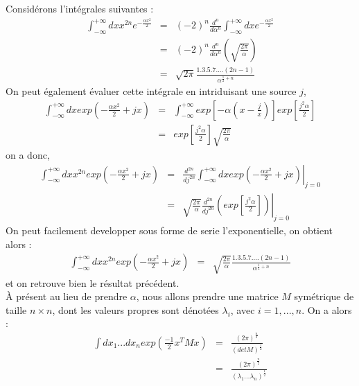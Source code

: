 \documentclass[a4paper,11pt]{article}
\theoremstyle{plain}
\theoremstyle{definition}
\theoremstyle{remark}
\numberwithin{equation}{section}
\numberwithin{equation}{subsection}
\numberwithin{figure}{section}
\begin{document}
\noindent
Considérons l'intégrales suivantes :
\begin{eqnarray}
 \int_{-\infty}^{+\infty} dx x^{2n} e^{- \frac{\alpha x^2}{2} }  &=& (-2)^{n} \frac{d^{n}}{d \alpha^{n}}  \int_{-\infty}^{+\infty} dx  
e^{- \frac{\alpha x^2}{2} }  \\
                                                                 &=& (-2)^{n} \frac{d^{n}}{d \alpha^{n}} \left( \sqrt{\frac{2 \pi}{\alpha}} \right) \\
                                                                 &=&  \sqrt{2 \pi}  \frac{1.3.5.7.  ... (2n-1)}{\alpha^{\frac{1}{2}+n}}
\end{eqnarray}
On peut également évaluer cette intégrale en intriduisant une source $j$,
\begin{eqnarray}
 \int_{-\infty}^{+\infty} dx  exp \left( - \frac{\alpha x^2}{2}  +j x \right) &=&  \int_{-\infty}^{+\infty}  
exp \left [ -\alpha \left( x- \frac{j}{x} \right) \right ] exp \left [ \frac{j^2 \alpha}{2} \right ]  \\
                                                                              &=&  exp \left [ \frac{j^2 \alpha}{2} \right ]   
\sqrt{\frac{2 \pi}{\alpha}}
\end{eqnarray}
on a donc,
\begin{eqnarray}
  \int_{-\infty}^{+\infty} dx  x^{2n}  exp \left( - \frac{\alpha x^2}{2}  +j x \right) &=& \left.  \frac{d^{2n}}{d j^{2n}}  
\int_{-\infty}^{+\infty} dx  exp \left( - \frac{\alpha x^2}{2}  +j x \right) \right |_{j=0} \\
                                                                                       &=&  \left.  \sqrt{\frac{2 \pi}{\alpha}}  
\frac{d^{2n}}{d j^{2n}}  \left( exp \left [ \frac{j^2 \alpha}{2} \right ]   \right)   \right |_{j=0}
\end{eqnarray}
On peut facilement developper sous forme de serie l'exponentielle, on obtient alors :
\begin{eqnarray}
  \int_{-\infty}^{+\infty} dx  x^{2n}  exp \left( - \frac{\alpha x^2}{2}  +j x \right) &=&   \sqrt{\frac{2 \pi}{\alpha}}  
\frac{1.3.5.7.  ...  (2n-1)}{\alpha ^{\frac{1}{2}+n}}
\end{eqnarray}
et on retrouve bien le résultat précédent.\\
À présent au lieu de prendre $\alpha$, nous allons prendre une matrice $M$ symétrique de taille $n \times n$, dont les valeurs propres 
sont dénotées $\lambda_{i}$, avec $i= 1, ..., n$. On a alors :
\begin{eqnarray}
 \int dx_{1}  ...  dx_{n} exp \left( \frac{-1}{2} x^{T} M x \right) &=&  
\frac{ \left(2 \pi \right)^{\frac{n}{2} }  }{ \left( det M \right)^{\frac{1}{2}} } \\
                                                                    &=&   
\frac{ \left(2 \pi \right)^{\frac{n}{2} }  }{ \left( \lambda_{1} ... \lambda_{n}  \right)^{\frac{1}{2}} }
\end{eqnarray}
\end{document}
